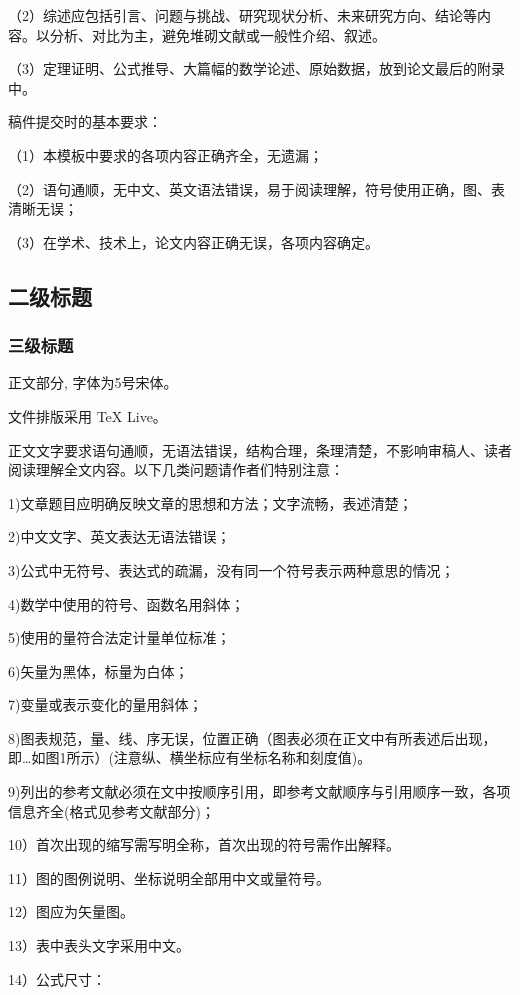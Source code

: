 \documentclass{cjc}
\begin{document}
（2）综述应包括引言、问题与挑战、研究现状分析、未来研究方向、结论等内容。以分析、对比为主，避免堆砌文献或一般性介绍、叙述。

（3）定理证明、公式推导、大篇幅的数学论述、原始数据，放到论文最后的附录中。

稿件提交时的基本要求：

（1）本模板中要求的各项内容正确齐全，无遗漏；

（2）语句通顺，无中文、英文语法错误，易于阅读理解，符号使用正确，图、表清晰无误；

（3）在学术、技术上，论文内容正确无误，各项内容确定。

\subsection{二级标题}

\subsubsection{三级标题}

正文部分, 字体为5号宋体。

文件排版采用 TeX Live。

正文文字要求语句通顺，无语法错误，结构合理，条理清楚，不影响审稿人、读者阅读理解全文内容。以下几类问题请作者们特别注意：

1)文章题目应明确反映文章的思想和方法；文字流畅，表述清楚；

2)中文文字、英文表达无语法错误；

3)公式中无符号、表达式的疏漏，没有同一个符号表示两种意思的情况；

4)数学中使用的符号、函数名用斜体；

5)使用的量符合法定计量单位标准；

6)矢量为黑体，标量为白体；

7)变量或表示变化的量用斜体；

8)图表规范，量、线、序无误，位置正确（图表必须在正文中有所表述后出现，即…如图1所示）(注意纵、横坐标应有坐标名称和刻度值)。

9)列出的参考文献必须在文中按顺序引用，即参考文献顺序与引用顺序一致，各项信息齐全(格式见参考文献部分)；

10）首次出现的缩写需写明全称，首次出现的符号需作出解释。

11）图的图例说明、坐标说明全部用中文或量符号。

12）图应为矢量图。

13）表中表头文字采用中文。

14）公式尺寸：
\end{document}
